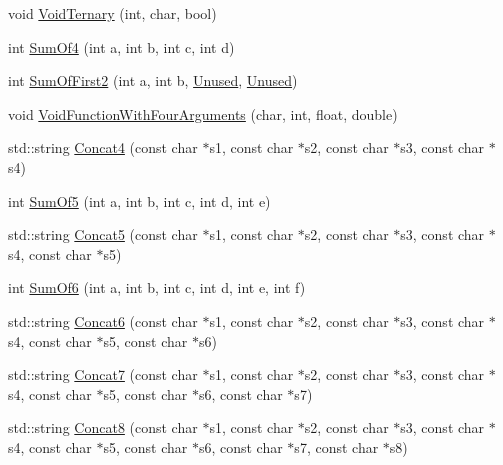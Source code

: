 \begin{DoxyCompactItemize}
\item 
void \mbox{\hyperlink{namespacetesting_1_1gmock__more__actions__test_ac41b49dc8ab365ccad7b332796421cd4}{Void\+Ternary}} (int, char, bool)
\item 
int \mbox{\hyperlink{namespacetesting_1_1gmock__more__actions__test_a41c348fff8608825239a276b8426a475}{Sum\+Of4}} (int a, int b, int c, int d)
\item 
int \mbox{\hyperlink{namespacetesting_1_1gmock__more__actions__test_aaa60ddffb96ddc3a73b0b22929ca5bec}{Sum\+Of\+First2}} (int a, int b, \mbox{\hyperlink{namespacetesting_a603e329ec0263ebfcf16f712810bd511}{Unused}}, \mbox{\hyperlink{namespacetesting_a603e329ec0263ebfcf16f712810bd511}{Unused}})
\item 
void \mbox{\hyperlink{namespacetesting_1_1gmock__more__actions__test_a8c952be61635486e84c1eca3bf3acd9b}{Void\+Function\+With\+Four\+Arguments}} (char, int, float, double)
\item 
std\+::string \mbox{\hyperlink{namespacetesting_1_1gmock__more__actions__test_a753ab28ecaa4133f11f9e34441b04595}{Concat4}} (const char $\ast$s1, const char $\ast$s2, const char $\ast$s3, const char $\ast$s4)
\item 
int \mbox{\hyperlink{namespacetesting_1_1gmock__more__actions__test_a38e64569bf08e83c6db22c1fb0fe0af6}{Sum\+Of5}} (int a, int b, int c, int d, int e)
\item 
std\+::string \mbox{\hyperlink{namespacetesting_1_1gmock__more__actions__test_ad96d89b9c9dd13ef8df8114e4b430e96}{Concat5}} (const char $\ast$s1, const char $\ast$s2, const char $\ast$s3, const char $\ast$s4, const char $\ast$s5)
\item 
int \mbox{\hyperlink{namespacetesting_1_1gmock__more__actions__test_a139632d344348fdfa25111d4e43f70ba}{Sum\+Of6}} (int a, int b, int c, int d, int e, int f)
\item 
std\+::string \mbox{\hyperlink{namespacetesting_1_1gmock__more__actions__test_a4ddf77266c433ef69d302bfc68153544}{Concat6}} (const char $\ast$s1, const char $\ast$s2, const char $\ast$s3, const char $\ast$s4, const char $\ast$s5, const char $\ast$s6)
\item 
std\+::string \mbox{\hyperlink{namespacetesting_1_1gmock__more__actions__test_a2ed0b2da1e123d5aaef59b0ea37e3844}{Concat7}} (const char $\ast$s1, const char $\ast$s2, const char $\ast$s3, const char $\ast$s4, const char $\ast$s5, const char $\ast$s6, const char $\ast$s7)
\item 
std\+::string \mbox{\hyperlink{namespacetesting_1_1gmock__more__actions__test_aa4419cf22a6e6760b8d38828f088cae1}{Concat8}} (const char $\ast$s1, const char $\ast$s2, const char $\ast$s3, const char $\ast$s4, const char $\ast$s5, const char $\ast$s6, const char $\ast$s7, const char $\ast$s8)

\end{DoxyCompactItemize}
